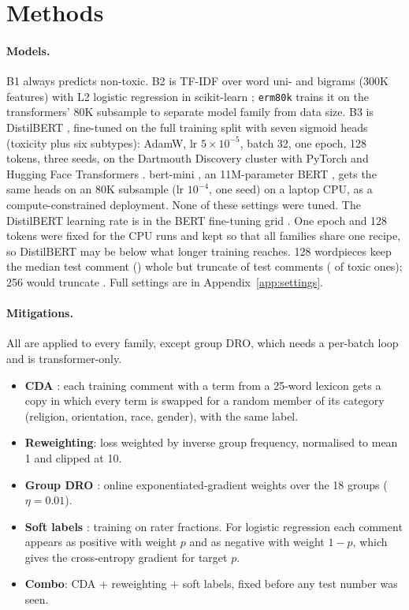 \documentclass[11pt]{article}
\begin{document}
\section{Methods}
\label{sec:methods}
\paragraph{Models.} B1 always predicts non-toxic. B2 is TF-IDF over word uni- and bigrams (300K features) with L2
logistic regression in scikit-learn \citep{pedregosa2011scikit}; \texttt{erm80k} trains it on the transformers' 80K
subsample to separate model family from data size. B3 is DistilBERT \citep{sanh2019distilbert}, fine-tuned on the full
training split with seven sigmoid heads (toxicity plus six subtypes): AdamW, lr $5{\times}10^{-5}$, batch 32, one
epoch, 128 tokens, three seeds, on the Dartmouth Discovery cluster with PyTorch \citep{paszke2019pytorch} and Hugging
Face Transformers \citep{wolf2020transformers}. bert-mini \citep{turc2019well}, an 11M-parameter BERT
\citep{devlin2019bert}, gets the same heads on an 80K subsample (lr $10^{-4}$, one seed) on a laptop CPU, as a
compute-constrained deployment. None of these settings were tuned. The DistilBERT learning rate is in the BERT
fine-tuning grid \citep{devlin2019bert}. One epoch and 128 tokens were fixed for the CPU runs and kept so that all
families share one recipe, so DistilBERT may be below what longer training reaches. 128 wordpieces keep the median
test comment (\TokMedian{}) whole but truncate \TokOverOneTwoEight{} of test comments (\TokToxicOverOneTwoEight{} of
toxic ones); 256 would truncate \TokOverTwoFiveSix{}. Full settings are in Appendix~\ref{app:settings}.

\paragraph{Mitigations.} All are applied to every family, except group DRO, which needs a per-batch loop and is
transformer-only.
\begin{itemize}\setlength\itemsep{0pt}\setlength\parskip{0pt}
\item \textbf{CDA} \citep{dixon2018measuring}: each training comment with a term from a 25-word lexicon gets a copy
in which every term is swapped for a random member of its category (religion, orientation, race, gender), with the
same label.
\item \textbf{Reweighting}: loss weighted by inverse group frequency, normalised to mean 1 and clipped at 10.
\item \textbf{Group DRO} \citep{sagawa2020distributionally}: online exponentiated-gradient weights over the 18 groups
($\eta{=}0.01$).
\item \textbf{Soft labels} \citep{davani2022dealing}: training on rater fractions. For logistic regression each
comment appears as positive with weight $p$ and as negative with weight $1{-}p$, which gives the cross-entropy
gradient for target $p$.
\item \textbf{Combo}: CDA + reweighting + soft labels, fixed before any test number was seen.
\end{itemize}
\end{document}
